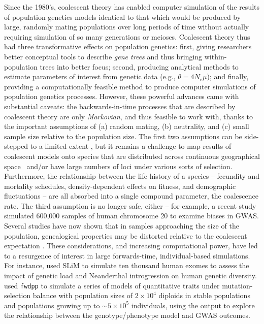 \documentclass{article}
\newcommand{\fwdpp}{\texttt{fwdpp}}
\begin{document}
Since the 1980's, coalescent theory has enabled computer simulation of the results of population genetics models
identical to that which would be produced by large, randomly mating populations over long periods of time
without actually requiring simulation of so many generations or meioses.
Coalescent theory thus had three transformative effects on population genetics:
first, giving researchers better conceptual tools to describe \emph{gene trees} and thus bringing within-population trees into better focus;
second, producing analytical methods to estimate parameters of interest from genetic data (e.g., $\theta = 4N_e \mu$);
and finally, providing a computationally feasible method to produce computer simulations of population genetics processes.
However, these powerful advances came with substantial caveats:
the backwards-in-time processes that are described by coalescent theory
are only \emph{Markovian}, and thus feasible to work with,
thanks to the important assumptions of
(a) random mating,
(b) neutrality,
and (c) small sample size relative to the population size.
The first two assumptions can be side-stepped to a limited extent \citep{hudson1990gene, Neuhauser1997-nn},
but it remains a challenge to map results of coalescent models
onto species that are distributed across continuous geographical
space~\citep{barton2010new,kelleher2014coalescent}
and/or have large numbers of loci under various sorts of selection.
Furthermore, the relationship between the life history of a species --
fecundity and mortality schedules, density-dependent effects on fitness, and demographic fluctuations --
are all absorbed into a single compound parameter, the coalescence rate.
The third assumption is no longer safe, either --
for example, a recent study~\citep{martin2017human}
simulated 600,000 samples of human chromosome 20 to examine biases in GWAS.
Several studies have now shown that in samples approaching the size of the population,
genealogical properties may be distorted relative to the coalescent expectation
\citep{wakeley2003gene,maruvka2011recovering,bhaskar2014distortion}.
These considerations, and increasing computational power, have led to a resurgence of
interest in large forwards-time, individual-based simulations.
For instance, \citet{harris2016genetic} used SLiM \citep{slim} to simulate ten thousand human exomes
to assess the impact of genetic load and Neanderthal introgression on human genetic diversity.
\cite{Sanjak2017-ko} used
\fwdpp{} \citep{fwdpp} to simulate a series of models of quantitative traits under mutation-selection balance with
population sizes of $2 \times 10^4$ diploids in stable populations and populations growing up to $\sim 5
\times 10^5$ individuals, using the output to explore the relationship between the genotype/phenotype model and GWAS
outcomes.
\end{document}

